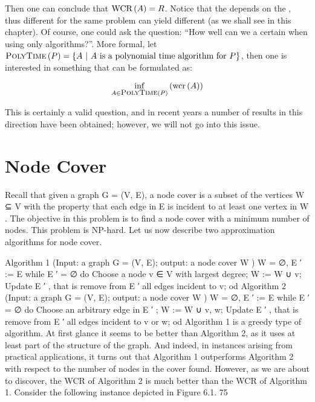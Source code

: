 Then one can conclude that $\mbox{WCR}\left( A \right)=R$. Notice that the  depends on the , thus different  for the same problem can yield different  (as we shall see in this chapter). Of course, one could ask the question: ``How well can we  a certain  when using only  algorithms?''. More formal, let $\mbox{\textsc{PolyTime}}\left( P \right)=\left\{ A\ |\ \mbox{$A$ is a polynomial time algorithm for $P$} \right\}$, then one is interested in something that can be formulated as:

\begin{equation}
\inf_{A\in\mbox{\textsc{\small{PolyTime}}}\left( P \right)}\left( \mbox{wcr}\left( A \right) \right)
\end{equation}

This is certainly a valid question, and in recent years a number of results in this direction have been obtained; however, we will not go into this issue.

\section{Node Cover}

Recall that given a graph G = (V, E), a node cover is a subset of the vertices W ⊆ V with the property
that each edge in E is incident to at least one vertex in W . The objective in this problem is to find
a node cover with a minimum number of nodes. This problem is NP-hard. Let us now describe two
approximation algorithms for node cover.

Algorithm 1 (Input: a graph G = (V, E); output: a node cover W )
W = ∅, E ′ := E
while E ′ = ∅
do
Choose a node v ∈ V with largest degree;
W := W ∪ {v};
Update E ′ , that is remove from E ′ all edges incident to v;
od
Algorithm 2 (Input: a graph G = (V, E); output: a node cover W )
W = ∅, E ′ := E
while E ′ = ∅
do
Choose an arbitrary edge in E ′ ;
W := W ∪ {v, w};
Update E ′ , that is remove from E ′ all edges incident to v or w;
od
Algorithm 1 is a greedy type of algorithm. At first glance it seems to be better than Algorithm 2, as it uses
at least part of the structure of the graph. And indeed, in instances arising from practical applications,
it turns out that Algorithm 1 outperforms Algorithm 2 with respect to the number of nodes in the cover
found. However, as we are about to discover, the WCR of Algorithm 2 is much better than the WCR of
Algorithm 1.
Consider the following instance depicted in Figure 6.1.
75

